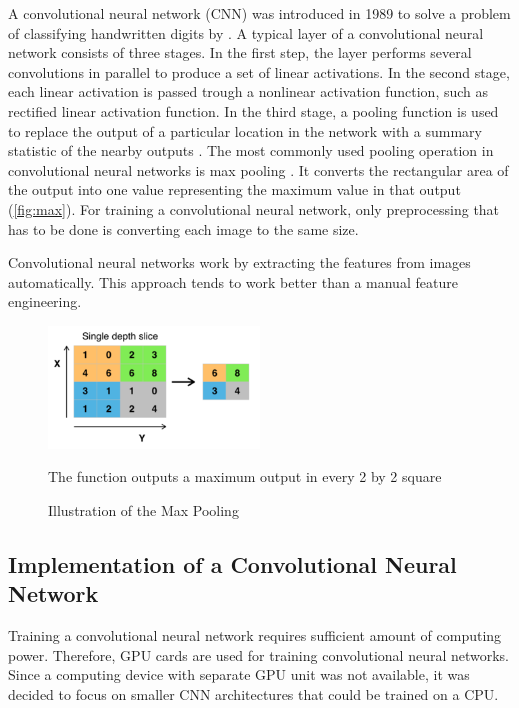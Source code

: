 A convolutional neural network (CNN) was introduced in 1989 to solve a problem of classifying handwritten digits by \cite{lecun}.
A typical layer of a convolutional neural network consists of three stages. In the first step, the layer performs several convolutions in parallel to produce a set of linear activations. In the second stage, each linear activation is passed trough a nonlinear activation function, such as rectified linear activation function. In the third stage, a pooling function is used to replace the output of a particular location in the network with a summary statistic of the nearby outputs \citep{Goodfellow-et-al-2017}. The most commonly used pooling operation in convolutional neural networks is max pooling \citep{max}. It converts the rectangular area of the output into one value representing the maximum value in that output (\autoref{fig:max}). For training a convolutional neural network, only preprocessing that has to be done is converting each image to the same size.

Convolutional neural networks work by extracting the features from images automatically. This approach tends to work better than a manual feature engineering.

\begin{figure}[h]
\centering
\includegraphics[width=0.5\textwidth]{Figures/4/Max_pooling.png}
\caption{Illustration of the Max Pooling} The function outputs a maximum output in every 2 by 2 square \citep{wiki:Convolutional}
\label{fig:max}
\end{figure}
 

\subsection{Implementation of a Convolutional Neural Network}

Training a convolutional neural network requires sufficient amount of computing power. Therefore,  GPU cards are used for training convolutional neural networks. Since a computing device with separate GPU unit was not available, it was decided to focus on smaller CNN architectures that could be trained on a CPU.

